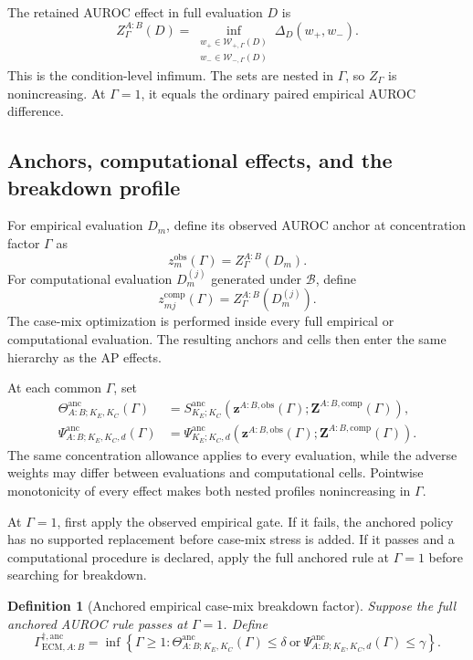 \documentclass[11pt]{article}
\newcommand{\Boot}{\mathcal{B}}
\newcommand{\Sanc}{S^{\mathrm{anc}}}
\newcommand{\Psianc}{\Psi^{\mathrm{anc}}}
\newcommand{\Thetaanc}{\Theta^{\mathrm{anc}}}
\newtheorem{definition}{Definition}
\theoremstyle{remark}
\begin{document}
The retained AUROC effect in full evaluation $D$ is
\begin{equation}
Z_\Gamma^{A:B}(D)
=
\inf_{\substack{
w_+\in\mathcal W_{+,\Gamma}(D)\\
w_-\in\mathcal W_{-,\Gamma}(D)}}
\Delta_D(w_+,w_-).
\label{eq:auroc-retained}
\end{equation}
This is the condition-level infimum. The sets are nested in $\Gamma$, so
$Z_\Gamma$ is nonincreasing. At $\Gamma=1$, it equals the ordinary paired
empirical AUROC difference.

\subsection{Anchors, computational effects, and the breakdown profile}

For empirical evaluation $D_m$, define its observed AUROC anchor at
concentration factor $\Gamma$ as
\[
z_m^{\mathrm{obs}}(\Gamma)
=Z_\Gamma^{A:B}(D_m).
\]
For computational evaluation $D_m^{(j)}$ generated under $\Boot$, define
\[
z_{mj}^{\mathrm{comp}}(\Gamma)
=Z_\Gamma^{A:B}(D_m^{(j)}).
\]
The case-mix optimization is performed inside every full empirical or
computational evaluation. The resulting anchors and cells then enter the same
hierarchy as the AP effects.

At each common $\Gamma$, set
\begin{align}
\Thetaanc_{A:B;K_E,K_C}(\Gamma)
&=
\Sanc_{K_E;K_C}
\left(
\mathbf z^{A:B,\mathrm{obs}}(\Gamma);
\mathbf Z^{A:B,\mathrm{comp}}(\Gamma)
\right),
\label{eq:auroc-anchored-magnitude}\\
\Psianc_{A:B;K_E,K_C,d}(\Gamma)
&=
\Psianc_{K_E;K_C,d}
\left(
\mathbf z^{A:B,\mathrm{obs}}(\Gamma);
\mathbf Z^{A:B,\mathrm{comp}}(\Gamma)
\right).
\label{eq:auroc-anchored-survival}
\end{align}
The same concentration allowance applies to every evaluation, while the
adverse weights may differ between evaluations and computational cells.
Pointwise monotonicity of every effect makes both nested profiles nonincreasing
in $\Gamma$.

At $\Gamma=1$, first apply the observed empirical gate. If it fails, the
anchored policy has no supported replacement before case-mix stress is added.
If it passes and a computational procedure is declared, apply the full
anchored rule at $\Gamma=1$ before searching for breakdown.

\begin{definition}[Anchored empirical case-mix breakdown factor]
Suppose the full anchored AUROC rule passes at $\Gamma=1$. Define
\begin{equation}
\Gamma_{\mathrm{ECM},A:B}^{\dagger,\mathrm{anc}}
=
\inf\left\{\Gamma\geq1:
\Thetaanc_{A:B;K_E,K_C}(\Gamma)\leq\delta
\ \text{or}\ 
\Psianc_{A:B;K_E,K_C,d}(\Gamma)\leq\gamma
\right\}.
\label{eq:anchored-breakdown}
\end{equation}
\end{definition}
\end{document}
